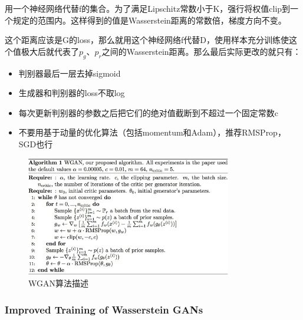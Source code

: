 \documentclass[a4paper]{article}
\begin{document}
用一个神经网络代替f的集合。为了满足Lipschitz常数小于K，强行将权值clip到一个规定的范围内。这样得到的值是Wasserstein距离的常数倍，梯度方向不变。

这个距离应该是G的loss，那么就用这个神经网络f代替D，使用样本充分训练使这个值极大后就代表了$p_g、p_r$之间的Wasserstein距离。那么最后实际更改的就只有：
\begin{itemize}

\item 判别器最后一层去掉sigmoid
\item 生成器和判别器的loss不取log
\item 每次更新判别器的参数之后把它们的绝对值截断到不超过一个固定常数c
\item 不要用基于动量的优化算法（包括momentum和Adam），推荐RMSProp，SGD也行
\end{itemize}
\begin{figure}
\centering
\includegraphics[width=0.8\textwidth]{./img/5.jpg}
\caption{WGAN算法描述}
\label{fig:5}
\end{figure}
\subsubsection{Improved Training of Wasserstein GANs\cite{DBLP:journals/corr/GulrajaniAADC17}}
\end{document}
